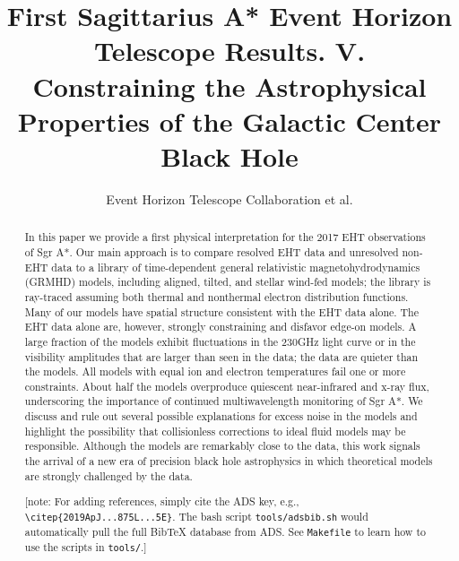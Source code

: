 \documentclass[twocolumn,twocolappendix,tighten,dvipsnames,linenumbers]{aastex63}
\newcommand\note[1]{{\color{OliveGreen}[note: #1]}}
\begin{document}
\title{First Sagittarius A* Event Horizon Telescope Results. V.\\
  Constraining the Astrophysical Properties of the Galactic Center Black Hole}

%
\author{Event Horizon Telescope Collaboration et al.}


\received{\today}
\revised{\today}

\begin{abstract}

In this paper we provide a first physical interpretation for the 2017 EHT observations of Sgr A*.  Our main approach is to compare resolved EHT data and unresolved non-EHT data to a library of time-dependent general relativistic magnetohydrodynamics (GRMHD) models, including aligned, tilted, and stellar wind-fed models; the library is ray-traced assuming both thermal and nonthermal electron distribution functions.  Many of our models have  spatial structure consistent with the EHT data alone.  The EHT data alone are, however, strongly constraining and disfavor edge-on models.  A large fraction of the models exhibit fluctuations in the $230$GHz light curve or in the visibility amplitudes that are larger than seen in the data; the data are quieter than the models.  All models with equal ion and electron temperatures fail one or more constraints.  About half the  models overproduce quiescent near-infrared and x-ray flux, underscoring the importance of continued multiwavelength monitoring of Sgr A*.  We discuss and rule out several possible explanations for excess noise in the models and highlight the possibility that collisionless corrections to ideal fluid models may be responsible.  Although the models are remarkably close to the data, this work signals the arrival of a new era of precision black hole astrophysics in which theoretical models are strongly challenged by the data.

\note{For adding references, simply cite the ADS key, e.g.,
  \texttt{\textbackslash citep\{2019ApJ...875L...5E\}}.
  The bash script \texttt{tools/adsbib.sh} would automatically pull
  the full BibTeX database from ADS.
  See \texttt{Makefile} to learn how to use the scripts in
  \texttt{tools/}.}
\end{abstract}
\end{document}
